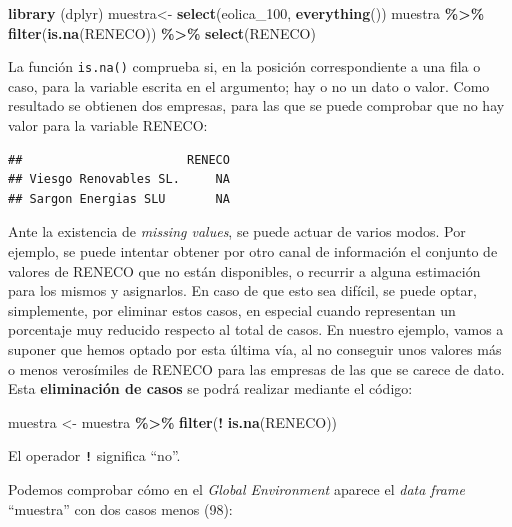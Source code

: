 \documentclass[
]{book}
\newenvironment{Shaded}{\begin{snugshade}}{\end{snugshade}}
\newcommand{\FunctionTok}[1]{\textcolor[rgb]{0.13,0.29,0.53}{\textbf{#1}}}
\newcommand{\NormalTok}[1]{#1}
\newcommand{\OtherTok}[1]{\textcolor[rgb]{0.56,0.35,0.01}{#1}}
\newcommand{\SpecialCharTok}[1]{\textcolor[rgb]{0.81,0.36,0.00}{\textbf{#1}}}
\begin{document}
\begin{Shaded}
\begin{Highlighting}[]
\FunctionTok{library}\NormalTok{ (dplyr)}
\NormalTok{muestra}\OtherTok{\textless{}{-}} \FunctionTok{select}\NormalTok{(eolica\_100, }\FunctionTok{everything}\NormalTok{())}
\NormalTok{muestra }\SpecialCharTok{\%\textgreater{}\%} \FunctionTok{filter}\NormalTok{(}\FunctionTok{is.na}\NormalTok{(RENECO)) }\SpecialCharTok{\%\textgreater{}\%} \FunctionTok{select}\NormalTok{(RENECO)}
\end{Highlighting}
\end{Shaded}

La función \texttt{is.na()} comprueba si, en la posición correspondiente a una fila o caso, para la variable escrita en el argumento; hay o no un dato o valor. Como resultado se obtienen dos empresas, para las que se puede comprobar que no hay valor para la variable RENECO:

\begin{verbatim}
##                       RENECO
## Viesgo Renovables SL.     NA
## Sargon Energias SLU       NA
\end{verbatim}

Ante la existencia de \emph{missing values}, se puede actuar de varios modos. Por ejemplo, se puede intentar obtener por otro canal de información el conjunto de valores de RENECO que no están disponibles, o recurrir a alguna estimación para los mismos y asignarlos. En caso de que esto sea difícil, se puede optar, simplemente, por eliminar estos casos, en especial cuando representan un porcentaje muy reducido respecto al total de casos. En nuestro ejemplo, vamos a suponer que hemos optado por esta última vía, al no conseguir unos valores más o menos verosímiles de RENECO para las empresas de las que se carece de dato. Esta \textbf{eliminación de casos} se podrá realizar mediante el código:

\begin{Shaded}
\begin{Highlighting}[]
\NormalTok{muestra }\OtherTok{\textless{}{-}}\NormalTok{ muestra }\SpecialCharTok{\%\textgreater{}\%} \FunctionTok{filter}\NormalTok{(}\SpecialCharTok{!} \FunctionTok{is.na}\NormalTok{(RENECO))}
\end{Highlighting}
\end{Shaded}

El operador \textbf{\texttt{!}} significa ``no''.

Podemos comprobar cómo en el \emph{Global Environment} aparece el \emph{data frame} ``muestra'' con dos casos menos (98):
\end{document}
